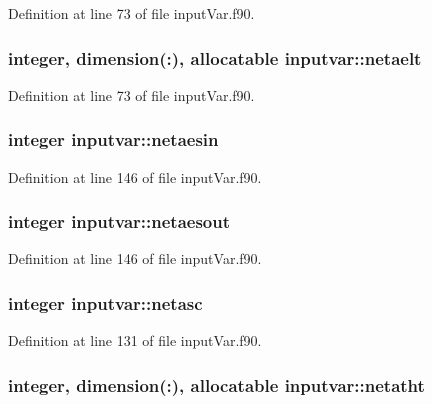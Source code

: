 Definition at line 73 of file input\-Var.\-f90.

\hypertarget{classinputvar_a2bfcb389a7fba156b8c1146150a71f51}{
\subsubsection[{netaelt}]{\setlength{\rightskip}{0pt plus 5cm}integer, dimension(\-:), allocatable inputvar\-::netaelt}}\label{classinputvar_a2bfcb389a7fba156b8c1146150a71f51}


Definition at line 73 of file input\-Var.\-f90.

\hypertarget{classinputvar_a5ded7ede4ce21d0a98a8055d9af0d827}{
\subsubsection[{netaesin}]{\setlength{\rightskip}{0pt plus 5cm}integer inputvar\-::netaesin}}\label{classinputvar_a5ded7ede4ce21d0a98a8055d9af0d827}


Definition at line 146 of file input\-Var.\-f90.

\hypertarget{classinputvar_ae8e6041b9d65c592b4ac141f652ca7e0}{
\subsubsection[{netaesout}]{\setlength{\rightskip}{0pt plus 5cm}integer inputvar\-::netaesout}}\label{classinputvar_ae8e6041b9d65c592b4ac141f652ca7e0}


Definition at line 146 of file input\-Var.\-f90.

\hypertarget{classinputvar_a803bd9bf1eb3b3aaa4e498bbad5c89c9}{
\subsubsection[{netasc}]{\setlength{\rightskip}{0pt plus 5cm}integer inputvar\-::netasc}}\label{classinputvar_a803bd9bf1eb3b3aaa4e498bbad5c89c9}


Definition at line 131 of file input\-Var.\-f90.

\hypertarget{classinputvar_acebcf3d64f116183dd364e920288729f}{
\subsubsection[{netatht}]{\setlength{\rightskip}{0pt plus 5cm}integer, dimension(\-:), allocatable inputvar\-::netatht}}\label{classinputvar_acebcf3d64f116183dd364e920288729f}


